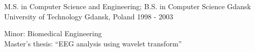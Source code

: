
\begin{cventries}

  \cventry
    {M.S. in Computer Science and Engineering; B.S. in Computer Science} %
    {Gdansk University of Technology} %
    {Gdansk, Poland} %
    {1998 - 2003} %
    {
      \begin{cvitems} %
        \item 
        {
          Minor: Biomedical Engineering \\
          Master’s thesis: “EEG analysis using wavelet transform”
        }
      \end{cvitems}
    }

\end{cventries}
